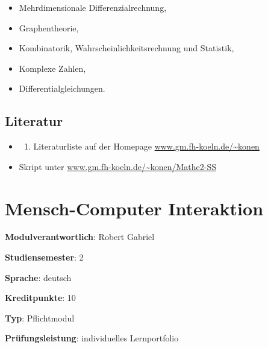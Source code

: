 \begin{itemize}
\tightlist
\item
  Mehrdimensionale Differenzialrechnung,
\item
  Graphentheorie,
\item
  Kombinatorik, Wahrscheinlichkeitsrechnung und Statistik,
\item
  Komplexe Zahlen,
\item
  Differentialgleichungen.
\end{itemize}

\hypertarget{literaturpathlabelmi-2017modulbeschreibungen-bachelorba_mathematik2}{%
\section*{Literatur\label{/mi-2017/modulbeschreibungen-bachelor/BA_Mathematik2}}\label{literaturpathlabelmi-2017modulbeschreibungen-bachelorba_mathematik2}}

\begin{itemize}
\tightlist
\item
  \begin{enumerate}
  \def\labelenumi{\alph{enumi}.}
  \setcounter{enumi}{18}
  \tightlist
  \item
    Literaturliste auf der Homepage
    \href{http://www.gm.fh-koeln.de/~konen}{www.gm.fh-koeln.de/\textasciitilde konen}
  \end{enumerate}
\item
  Skript unter
  \href{http://www.gm.fh-koeln.de/~konen/Mathe2-SS}{www.gm.fh-koeln.de/\textasciitilde konen/Mathe2-SS}
\end{itemize}

\hypertarget{mensch-computer-interaktionpathlabelmi-2017modulbeschreibungen-bachelorba_mensch-computer_interaktion}{%
\chapter{Mensch-Computer
Interaktion\label{/mi-2017/modulbeschreibungen-bachelor/BA_Mensch-Computer_Interaktion}}\label{mensch-computer-interaktionpathlabelmi-2017modulbeschreibungen-bachelorba_mensch-computer_interaktion}}

\begin{modulHead}
\textbf{Modulverantwortlich}: Robert
Gabriel
\end{modulHead}
\begin{modulHead}
\textbf{Studiensemester}:
2
\end{modulHead}
\begin{modulHead}
\textbf{Sprache}:
deutsch
\end{modulHead}
\begin{modulHead}
\textbf{Kreditpunkte}:
10
\end{modulHead}
\begin{modulHead}
\textbf{Typ}:
Pflichtmodul
\end{modulHead}
\begin{modulHead}
\textbf{Prüfungsleistung}:
individuelles Lernportfolio
\end{modulHead}


